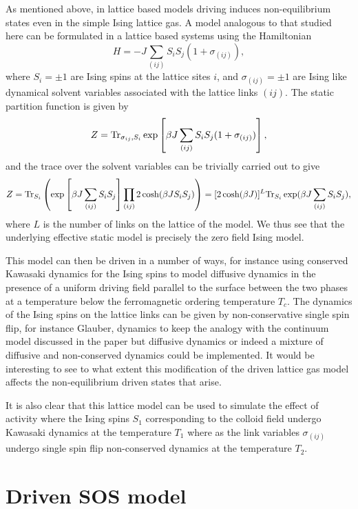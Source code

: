 As mentioned above, in lattice based models driving induces non-equilibrium states even in the simple Ising lattice gas. A model analogous to that studied here can be formulated in a lattice based systems using the Hamiltonian 
\begin{equation}
    H = -J\sum_{(ij)}S_i S_j (1+ \sigma_{(ij)}),
\end{equation}
where $S_i=\pm1$ are Ising spins at the lattice sites $i$, and $\sigma_{(ij)}=\pm 1$ are Ising like dynamical solvent variables associated with the lattice links $(ij)$. The static partition function is given by
\begin{equation}
    Z = {\rm Tr}_{\sigma_{ij},S_i} \exp\left[\beta J\sum_{(ij)}S_i S_j (1+ \sigma_{(ij)})\right],
\end{equation}
and the trace over the solvent variables can be trivially carried out to give
\begin{equation}
    Z = {\rm Tr}_{S_i}\left( \exp\left[\beta J\sum_{(ij)}S_i S_j \right]\prod_{(ij)}2\cosh(\beta JS_iS_j)\right )= [2\cosh(\beta J)]^L{\rm Tr}_{S_i}\exp(\beta J\sum_{(ij)}S_i S_j ),
\end{equation}
where $L$ is the number of links on the lattice of the model. We thus see that the underlying effective static model is precisely the zero field Ising model. 

This model can then be driven in a number of ways, for instance using conserved Kawasaki dynamics for the Ising spins to model diffusive dynamics in the presence of a uniform driving field parallel to the surface between the two phases at a temperature below the ferromagnetic ordering temperature $T_c$. The dynamics of the Ising spins on the lattice links can  be given by non-conservative single spin flip, for instance Glauber, dynamics to keep the analogy with the continuum model discussed in the paper but diffusive dynamics or indeed a mixture of diffusive and non-conserved dynamics 
could be implemented. It would be interesting to see to what extent this modification of the driven lattice gas model affects the non-equilibrium driven states that arise. 

It is also clear that this lattice model can be used to simulate the effect of activity where the Ising spins $S_1$ corresponding to the colloid field undergo  Kawasaki dynamics at the temperature $T_1$ where as the link variables $\sigma_{(ij)}$ undergo single spin flip non-conserved dynamics
at the temperature $T_2$.   

    \section{Driven SOS model}

